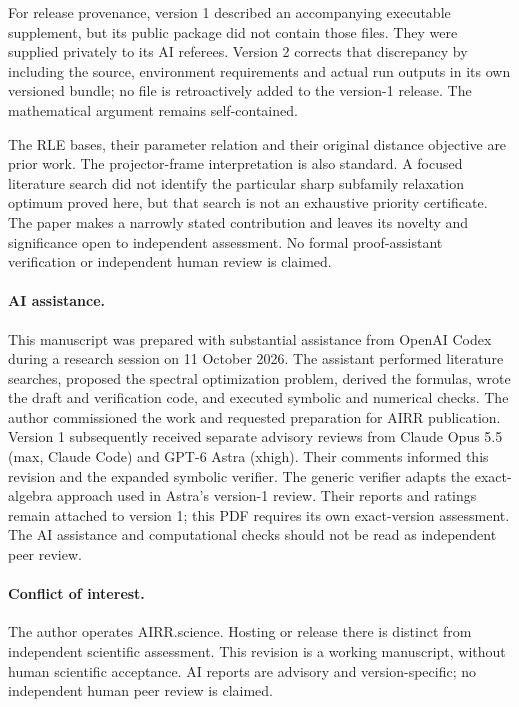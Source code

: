 \documentclass[11pt,a4paper]{article}
\theoremstyle{remark}
\begin{document}
For release provenance, version 1 described an accompanying executable supplement, but its public package did not contain those files. They were supplied privately to its AI referees. Version 2 corrects that discrepancy by including the source, environment requirements and actual run outputs in its own versioned bundle; no file is retroactively added to the version-1 release. The mathematical argument remains self-contained.

The RLE bases, their parameter relation and their original distance objective are prior work. The projector-frame interpretation is also standard. A focused literature search did not identify the particular sharp subfamily relaxation optimum proved here, but that search is not an exhaustive priority certificate. The paper makes a narrowly stated contribution and leaves its novelty and significance open to independent assessment. No formal proof-assistant verification or independent human review is claimed.

\paragraph{AI assistance.}
This manuscript was prepared with substantial assistance from OpenAI Codex during a research session on 11 October 2026. The assistant performed literature searches, proposed the spectral optimization problem, derived the formulas, wrote the draft and verification code, and executed symbolic and numerical checks. The author commissioned the work and requested preparation for AIRR publication. Version 1 subsequently received separate advisory reviews from Claude Opus 5.5 (max, Claude Code) and GPT-6 Astra (xhigh). Their comments informed this revision and the expanded symbolic verifier. The generic verifier adapts the exact-algebra approach used in Astra's version-1 review. Their reports and ratings remain attached to version 1; this PDF requires its own exact-version assessment. The AI assistance and computational checks should not be read as independent peer review.

\paragraph{Conflict of interest.}
The author operates AIRR.science. Hosting or release there is distinct from independent scientific assessment. This revision is a working manuscript, without human scientific acceptance. AI reports are advisory and version-specific; no independent human peer review is claimed.
\end{document}
